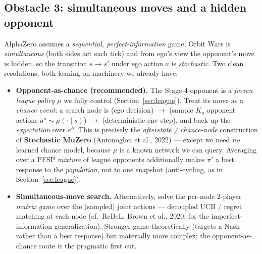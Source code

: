 \documentclass[11pt]{article}
\begin{document}
\subsection{Obstacle 3: simultaneous moves and a hidden opponent}
AlphaZero assumes a \emph{sequential, perfect-information} game; Orbit Wars is \emph{simultaneous}
(both sides act each tick) and from ego's view the opponent's move is hidden, so the transition
$s\!\to\!s'$ under ego action $a$ is \emph{stochastic}. Two clean resolutions, both leaning on machinery
we already have:
\begin{itemize}[nosep]
\item \textbf{Opponent-as-chance (recommended).} The Stage-4 opponent is a \emph{frozen league policy}
$\mu$ we fully control (Section~\ref{sec:league}). Treat its move as a \emph{chance event}: a search node
is (ego decision) $\to$ (sample $K_o$ opponent actions $a^o\!\sim\!\mu(\cdot\mid s)$) $\to$ (deterministic
env step), and back up the \emph{expectation} over $a^o$. This is precisely the \emph{afterstate /
chance-node} construction of \textbf{Stochastic MuZero} (Antonoglou et al., 2022) --- except we need
\emph{no} learned chance model, because $\mu$ is a known network we can query. Averaging over a PFSP
\emph{mixture} of league opponents additionally makes $\pi'$ a best response to the \emph{population},
not to one snapshot (anti-cycling, as in Section~\ref{sec:league}).
\item \textbf{Simultaneous-move search.} Alternatively, solve the per-node $2$-player \emph{matrix game}
over the (sampled) joint actions --- decoupled UCB / regret matching at each node (cf.\ ReBeL,
Brown et al., 2020, for the imperfect-information generalization). Stronger game-theoretically (targets a
Nash rather than a best response) but materially more complex; the opponent-as-chance route is the
pragmatic first cut.
\end{itemize}
\end{document}

